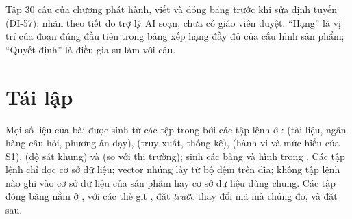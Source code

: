 Tập $30$ câu của chương phát hành, viết và đóng băng trước khi sửa định tuyến (DI-57); nhãn theo tiết do trợ lý AI soạn, chưa có giáo viên duyệt. ``Hạng'' là vị trí của đoạn đúng đầu tiên trong bảng xếp hạng đầy đủ của cấu hình sản phẩm; ``Quyết định'' là điều gia sư làm với câu.

\begin{center}
\label{tab:v2-questions}

\end{center}

\section{Tái lập}\label{app:repro}

Mọi số liệu của bài được sinh từ các tệp trong  bởi các tập lệnh ở :  (tài liệu, ngân hàng câu hỏi, phương án dạy),  (truy xuất, thống kê),  (hành vi và mức hiểu của S1),  (độ sát khung) và  (so với thị trường);  sinh các bảng và hình trong . Các tập lệnh chỉ đọc cơ sở dữ liệu; vector nhúng lấy từ bộ đệm trên đĩa; không tập lệnh nào ghi vào cơ sở dữ liệu của sản phẩm hay cơ sở dữ liệu dùng chung. Các tập đóng băng nằm ở , với các thẻ git ,  đặt \emph{trước} thay đổi mã mà chúng đo, và  đặt sau.
